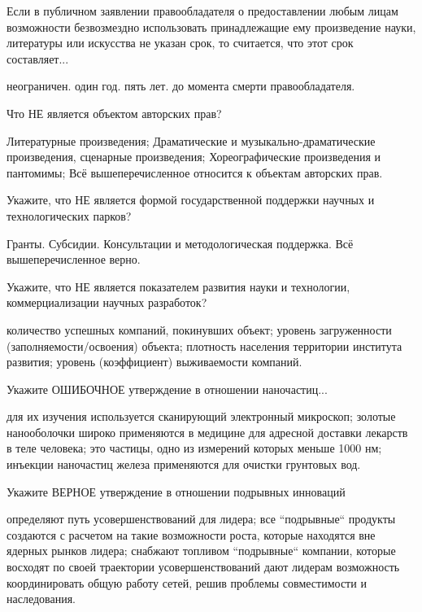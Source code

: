 \documentclass[12pt, table]{exam}
\begin{document}
\begin{questions}
\begin{multicols}{2}
\question Если в публичном заявлении правообладателя о предоставлении любым лицам возможности безвозмездно использовать принадлежащие ему произведение науки, литературы или искусства не указан срок, то считается, что этот срок составляет...
\begin{choices}
	\choice неограничен.
	\choice один год.
	\CC пять лет. 
	\choice до момента смерти правообладателя.
\end{choices}
\question Что НЕ является объектом авторских прав?
\begin{choices}
	\choice Литературные произведения;
	\choice Драматические и музыкально-драматические произведения, сценарные произведения;
	\choice Хореографические произведения и пантомимы;
	\CC Всё вышеперечисленное относится к объектам авторских прав.
\end{choices}
\question Укажите, что НЕ является формой государственной поддержки научных и технологических парков?
\begin{choices}
	\choice Гранты.
	\choice Субсидии.
	\choice Консультации и методологическая поддержка.
	\CC Всё вышеперечисленное верно.
\end{choices}
\question Укажите, что НЕ является показателем развития науки и технологии, коммерциализации научных разработок?
\begin{choices}
	\choice количество успешных компаний, покинувших объект;
	\choice уровень загруженности (заполняемости/освоения) объекта;
	\CC плотность населения территории института развития;
	\choice уровень (коэффициент) выживаемости компаний.
\end{choices}
\question Укажите ОШИБОЧНОЕ утверждение в отношении наночастиц...
\begin{choices}
	\choice для их изучения используется сканирующий электронный микроскоп;
	\choice золотые нанооболочки широко применяются в медицине для адресной доставки лекарств в теле человека;
	\CC это частицы, одно из измерений которых меньше 1000 нм;
	\choice инъекции наночастиц железа применяются для очистки грунтовых вод.
\end{choices}
\question Укажите ВЕРНОЕ утверждение в отношении подрывных инноваций
\begin{choices}
	\choice определяют путь усовершенствований для лидера;
	\CC все ``подрывные`` продукты создаются с расчетом на такие возможности роста, которые находятся вне ядерных рынков лидера;
	\choice снабжают топливом “подрывные“ компании, которые восходят по своей траектории усовершенствований
	\choice дают лидерам возможность координировать общую работу сетей, решив проблемы совместимости и наследования.
\end{choices}

\end{multicols}
\end{questions}
\end{document}
